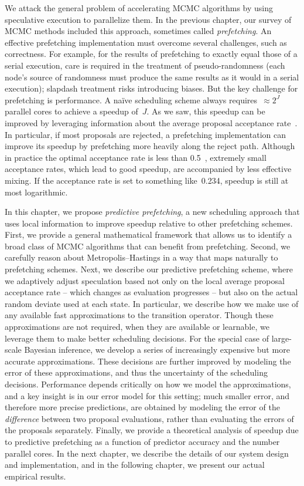 \documentclass[angelino.tex]{subfiles}
\begin{document}
We attack the general problem of accelerating MCMC algorithms
by using speculative execution to parallelize them.
In the previous chapter, our survey of MCMC methods included
this approach, sometimes called \emph{prefetching}.
An effective prefetching implementation must overcome several challenges,
such as correctness.
For example, for the results of prefetching to exactly equal those of a
serial execution, care is required in the treatment of pseudo-randomness
(\ie each node's source of randomness must produce the same results
as it would in a serial execution); slapdash treatment risks introducing biases.
%
But the key challenge for prefetching is performance.
A na\"{i}ve scheduling scheme always requires~${\approx 2^J}$ parallel cores to 
achieve a speedup of~$J$.
As we saw, this speedup can be improved by leveraging information about the
average proposal acceptance rate~\citep{strid-2010-prefetching}.
%
In particular, if most proposals are rejected, a prefetching implementation
can improve its speedup by prefetching more heavily along the reject path.
%
Although in practice the optimal acceptance rate is less than 
0.5~\citep{roberts-1997-accept}, extremely small acceptance rates,
which lead to good speedup, are accompanied by less effective mixing.
If the acceptance rate is set to something like~0.234,
speedup is still at most logarithmic.

In this chapter, we propose \emph{predictive prefetching}, a new scheduling
approach that uses local information to improve speedup relative to other 
prefetching schemes.
%
First, we provide a general mathematical framework that allows us to identify a
broad class of MCMC algorithms that can benefit from prefetching.
%
Second, we carefully reason about Metropolis--Hastings in a way that maps
naturally to prefetching schemes.
%
Next, we describe our predictive prefetching scheme, where we adaptively adjust 
speculation based not only on the local average proposal acceptance rate --
which changes as evaluation progresses --
but also on the actual random deviate used at each state.
%
In particular, we describe how we make use of any available fast approximations
to the transition operator.
%
Though these approximations are not required, when they are available or
learnable, we leverage them to make better scheduling decisions.
%
For the special case of large-scale Bayesian inference,
we develop a series of increasingly expensive but more accurate approximations.
%
These decisions are further improved by modeling the error of these
approximations, and thus the uncertainty of the scheduling decisions.
%
Performance depends critically on how we model the approximations,
and a key insight is in our error model for this setting;
much smaller error, and therefore more precise predictions,
are obtained by modeling the error of the \emph{difference} between two proposal 
evaluations, rather than evaluating the errors of the proposals separately.
%
Finally, we provide a theoretical analysis of speedup due to predictive
prefetching as a function of predictor accuracy and the number parallel cores.
%
In the next chapter, we describe the details of our system design and
implementation, and in the following chapter, we present our actual
empirical results.
\end{document}
